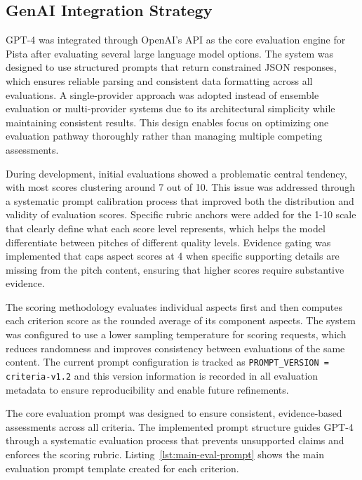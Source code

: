 \subsection{GenAI Integration Strategy}\label{subsec:GenAI-integration-strategy}
GPT-4 was integrated through OpenAI's API as the core evaluation engine for Pista after evaluating several large language model options. The system was designed to use structured prompts that return constrained JSON responses, which ensures reliable parsing and consistent data formatting across all evaluations. A single-provider approach was adopted instead of ensemble evaluation or multi-provider systems due to its architectural simplicity while maintaining consistent results. This design enables focus on optimizing one evaluation pathway thoroughly rather than managing multiple competing assessments.

During development, initial evaluations showed a problematic central tendency, with most scores clustering around 7 out of 10. This issue was addressed through a systematic prompt calibration process that improved both the distribution and validity of evaluation scores. Specific rubric anchors were added for the 1-10 scale that clearly define what each score level represents, which helps the model differentiate between pitches of different quality levels. Evidence gating was implemented that caps aspect scores at 4 when specific supporting details are missing from the pitch content, ensuring that higher scores require substantive evidence.

The scoring methodology evaluates individual aspects first and then computes each criterion score as the rounded average of its component aspects. The system was configured to use a lower sampling temperature for scoring requests, which reduces randomness and improves consistency between evaluations of the same content. The current prompt configuration is tracked as \texttt{PROMPT\_VERSION = criteria\textrm{-}v1.2} and this version information is recorded in all evaluation metadata to ensure reproducibility and enable future refinements.

The core evaluation prompt was designed to ensure consistent, evidence-based assessments across all criteria. The implemented prompt structure guides GPT-4 through a systematic evaluation process that prevents unsupported claims and enforces the scoring rubric. Listing~\ref{lst:main-eval-prompt} shows the main evaluation prompt template created for each criterion.

